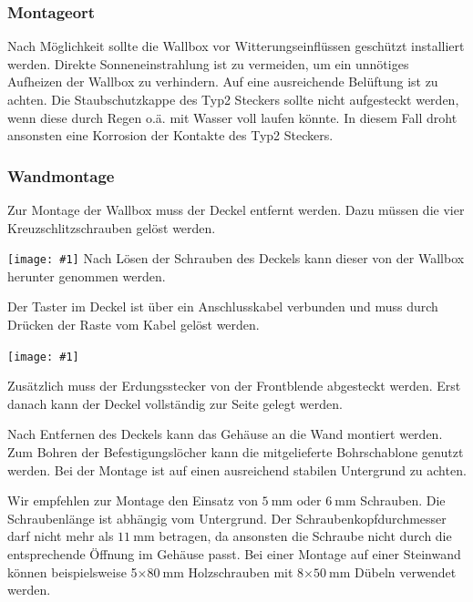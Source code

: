 \documentclass[a4paper,10pt]{article}
\newcommand{\hint}[1]{\begin{tcolorbox}[colback=boxgray,colframe=black,coltext=
white,title=Hinweis,left*=2mm,right*=2mm,boxsep=1mm,bottom=1mm,top=1mm]#1\end{tcolorbox}}
\newcommand{\gfx}[1]{\texttt{[image: \#1]}}
\begin{document}
\begin{multicols*}{2}
	\subsubsection{Montageort}
	Nach Möglichkeit sollte die Wallbox vor Witterungseinflüssen geschützt
	installiert werden. Direkte Sonneneinstrahlung ist zu vermeiden, um ein
	unnötiges Aufheizen der Wallbox zu verhindern. Auf eine ausreichende Belüftung
	ist zu achten. Die Staubschutzkappe des Typ2 Steckers sollte nicht aufgesteckt
	werden, wenn diese durch Regen o.ä. mit Wasser voll laufen könnte. In diesem Fall
	droht ansonsten eine Korrosion der Kontakte des Typ2 Steckers.

	\subsubsection{Wandmontage}\label{wandmontage}
	Zur Montage der Wallbox muss der Deckel entfernt werden. Dazu müssen die
	vier Kreuzschlitzschrauben gelöst werden.

	\gfx{./img_warp2/resized/warp_screw_points_ready}
	Nach Lösen der Schrauben des Deckels kann dieser von der Wallbox herunter genommen
	werden.

	\hint{Der Taster im Deckel ist über ein Anschlusskabel verbunden und muss
		durch Drücken der Raste vom Kabel gelöst werden.}

	\gfx{./img_warp2/resized/warp2_button_and_gnd_600}

	Zusätzlich muss der Erdungsstecker von der Front\-blende abgesteckt werden.
	Erst danach kann der Deckel vollständig zur Seite gelegt werden.

	Nach Entfernen des Deckels kann das Gehäuse an die Wand montiert werden. Zum
	Bohren der Befestigungslöcher kann die mitgelieferte Bohrschablone genutzt
	werden. Bei der Montage ist auf einen ausreichend stabilen Untergrund zu
	achten.

	Wir empfehlen zur Montage den Einsatz von $\SI{5}{\milli\meter}$ oder
	$\SI{6}{\milli\meter}$ Schrauben. Die Schraubenlänge ist abhängig vom
	Untergrund. Der Schraubenkopfdurchmesser darf nicht mehr als
	$\SI{11}{\milli\meter}$ betragen, da ansonsten die Schraube nicht durch die
	entsprechende Öffnung im Gehäuse passt. Bei einer Montage auf einer Steinwand
	können beispielsweise 5$\times\SI{80}{\milli\meter}$ Holzschrauben
	mit 8$\times\SI{50}{\milli\meter}$ Dübeln  verwendet werden.


\end{multicols*}
\end{document}
